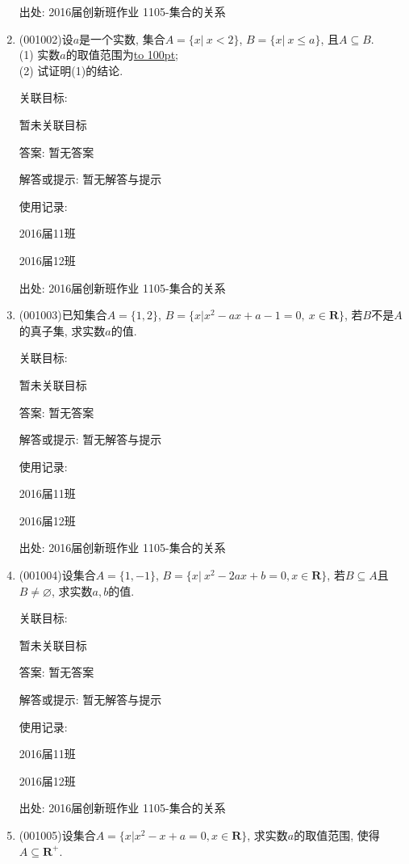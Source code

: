 \documentclass[10pt,a4paper]{article}
\newcommand{\blank}[1]{\underline{\hbox to #1pt{}}}
\begin{document}
\begin{enumerate}[1.]
出处: 2016届创新班作业	1105-集合的关系
\item { (001002)}设$a$是一个实数, 集合$A=\{x|\ x<2\}$, $B=\{x|\ x\leq a\}$, 且$A \subseteq B$.\\ 
(1) 实数$a$的取值范围为\blank{100};\\ 
(2) 试证明(1)的结论.


关联目标:

暂未关联目标

答案: 暂无答案

解答或提示: 暂无解答与提示

使用记录:

2016届11班		

2016届12班		


出处: 2016届创新班作业	1105-集合的关系
\item { (001003)}已知集合$A=\{1,2\}$, $B=\{x|x^2-ax+a-1=0,\ x\in\mathbf{R}\}$, 若$B$不是$A$的真子集, 求实数$a$的值.


关联目标:

暂未关联目标

答案: 暂无答案

解答或提示: 暂无解答与提示

使用记录:

2016届11班	

2016届12班	


出处: 2016届创新班作业	1105-集合的关系
\item { (001004)}设集合$A=\{1,-1\}$, $B=\{x|\ x^2-2ax+b=0,x\in\mathbf{R}\}$, 若$B\subseteq A$且$B\neq\varnothing$, 求实数$a,b$的值.


关联目标:

暂未关联目标

答案: 暂无答案

解答或提示: 暂无解答与提示

使用记录:

2016届11班	

2016届12班	


出处: 2016届创新班作业	1105-集合的关系
\item { (001005)}设集合$A=\{x|x^2-x+a=0, x \in \mathbf{R}\}$, 求实数$a$的取值范围, 使得$A \subseteq \mathbf{R}^+$.



\end{enumerate}
\end{document}

